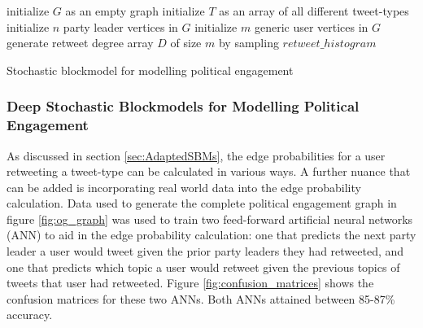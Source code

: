 \begin{singlespacing}
\begin{algorithm}[H]
    \SetAlgoLined
    initialize $G$ as an empty graph\;
    initialize $T$ as an array of all different tweet-types\;
    initialize $n$ party leader vertices in $G$\;
    initialize $m$ generic user vertices in $G$\;
    generate retweet degree array $D$ of size $m$ by sampling $retweet\_histogram$\;
     \caption{Stochastic blockmodel for modelling political engagement}
     \label{algorithm:SBM}
\end{algorithm}
\end{singlespacing}


\subsubsection{Deep Stochastic Blockmodels for Modelling Political Engagement}\label{sec:DeepSBMs}

As discussed in section \ref{sec:AdaptedSBMs}, the edge probabilities for a user
retweeting a tweet-type can be calculated in various ways. A further nuance that
can be added is incorporating real world data into the edge probability
calculation. Data used to generate the complete political engagement graph in
figure \ref{fig:og_graph} was used to train two feed-forward artificial neural
networks (ANN) to aid in the edge probability calculation: one that predicts the next
party leader a user would tweet given the prior party leaders they had
retweeted, and one that predicts which topic a user would retweet given the
previous topics of tweets that user had retweeted. Figure \ref{fig:confusion_matrices} shows the
confusion matrices for these two ANNs. Both ANNs attained between 85-87\% accuracy.

